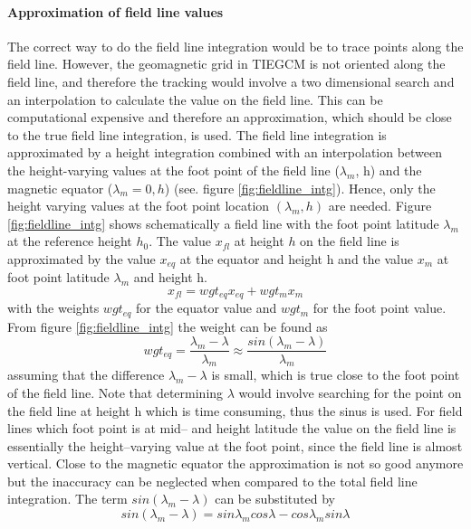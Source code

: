 \paragraph{Approximation of field line values}
%
The correct way to do the field line integration would be to trace points along
the field line. However, the geomagnetic grid in TIEGCM is not oriented along the field line,
and therefore the tracking
would involve a two dimensional search and an interpolation to calculate the value on the field
line. This can be computational expensive and therefore an approximation, which should be close
to the true field line integration, is used.
The field line integration is approximated by a height integration 
combined with an interpolation
between the height-varying values at the foot point of the field line ($\lambda_m$, h) and the magnetic 
equator ($\lambda_m = 0, h$) (see. figure  \ref{fig:fieldline_intg}). Hence, only the height varying values at the foot point location 
$(\lambda_m, h)$ are needed.
Figure \ref{fig:fieldline_intg} shows schematically
a field line with the foot point latitude $\lambda_m$ at the reference height $h_0$. The
value $x_{fl}$ at height $h$ on the field line is approximated by the 
value $x_{eq}$ at the equator and height h
and the value $x_m$ at foot point latitude $\lambda_m$ and height h.
%
\begin{equation}
 x_{fl} = wgt_{eq} x_{eq} + wgt_m x_m \label{eq:approx_fl}
\end{equation}
%
with the weights $wgt_{eq}$ for the equator value and $wgt_{m}$  for the foot point value. 
From figure \ref{fig:fieldline_intg} the weight can be found as
%
\begin{equation}
 wgt_{eq} = \frac{\lambda_m -\lambda}{\lambda_m} \approx  
            \frac{sin(\lambda_m -\lambda)}{\lambda_m} \label{eq:wgh1}
\end{equation}
%
assuming that the difference $\lambda_m -\lambda$ is small, which is true close to the
foot point of the field line. Note that determining $\lambda$ would involve searching for the
point on the field line at height h which is time consuming, thus the sinus is used.
For field lines which foot point is at mid-- and height latitude the value on the
field line is essentially the height--varying value at the foot point, since the field line is
almost vertical.
Close to the magnetic equator the approximation is not so good anymore but the inaccuracy 
can be neglected when compared to the total field line integration.
 The term
$sin(\lambda_m -\lambda)$ can be substituted by
%
\begin{equation}
 sin(\lambda_m -\lambda) = sin \lambda_m cos \lambda - cos \lambda_m sin \lambda \label{eq:wgh2}
\end{equation}
